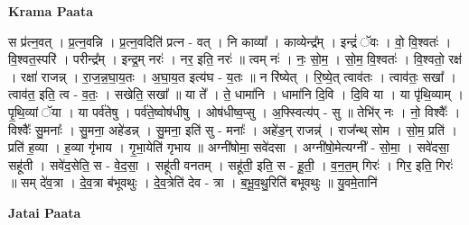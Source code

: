 \documentclass[17pt]{extarticle}
\begin{document}
\textbf{Krama Paata} \newline

स प्र॑त्न॒वत् । प्र॒त्न॒वन्नि । प्र॒त्न॒वदिति॑ प्रत्न - वत् । नि काव्या᳚ । काव्येन्द्र᳚म् । इन्द्रं॑ ॅवः । वो॒ वि॒श्वतः॑ । वि॒श्वत॒स्परि॑ । परीन्द्र᳚म् । इन्द्र॒म् नरः॑ । नर॒ इति॒ नरः॑ ॥ त्वम् नः॑ । नः॒ सो॒म॒ । सो॒म॒ वि॒श्वतः॑ । वि॒श्वतो॒ रक्ष॑ । रक्षा॑ राजन्न् । रा॒ज॒न्न॒घा॒य॒तः । अ॒घा॒य॒त इत्य॑घ - य॒तः ॥ न रि॑ष्येत् । रि॒ष्ये॒त् त्वाव॑तः । त्वाव॑तः॒ सखा᳚ । त्वाव॑त॒ इति॒ त्व - व॒तः॒ । सखेति॒ सखा᳚ ॥ या ते᳚ । ते॒ धामा॑नि । धामा॑नि दि॒वि । दि॒वि या । या पृ॑थि॒व्याम् । पृ॒थि॒व्यां ॅया । या पर्व॑तेषु । पर्व॑ते॒ष्वोष॑धीषु । ओष॑धीष्व॒प्सु । अ॒फ्स्वित्य॑प् - सु ॥ तेभि॑र् नः । नो॒ विश्वैः᳚ । विश्वैः᳚ सु॒मनाः᳚ । सु॒मना॒ अहे॑डन्न् । सु॒मना॒ इति॑ सु - मनाः᳚ । अहे॑ड॒न् राजन्न्॑ । राज᳚न्थ् सोम । सो॒म॒ प्रति॑ । प्रति॑ ह॒व्या । ह॒व्या गृ॑भाय । गृ॒भा॒येति॑ गृभाय ॥ अग्नी॑षोमा॒ सवे॑दसा । अग्नी॑षो॒मेत्यग्नी᳚ - सो॒मा॒ । सवे॑दसा॒ सहू॑ती । सवे॑द॒सेति॒ स - वे॒द॒सा॒ । सहू॑ती वनतम् । सहू॑ती॒ इति॒ स - हू॒ती॒ । व॒न॒त॒म् गिरः॑ । गिर॒ इति॒ गिरः॑ ॥ सम् दे॑व॒त्रा । दे॒व॒त्रा ब॑भूवथुः । दे॒व॒त्रेति॑ देव - त्रा । ब॒भू॒व॒थु॒रिति॑ बभूवथुः ॥ यु॒वमे॒तानि॑ \newline

\textbf{Jatai Paata} \newline
\end{document}
